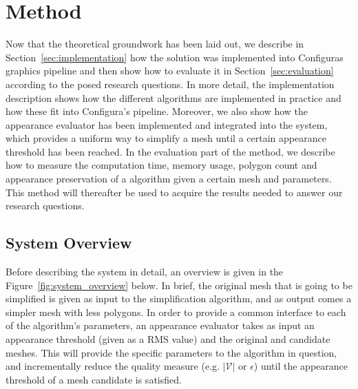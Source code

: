 
\chapter{Method} \label{cha:method}

    Now that the theoretical groundwork has been laid out, we describe in Section~\ref{sec:implementation} how the solution was implemented into Configuras graphics pipeline and then show how to evaluate it in Section~\ref{sec:evaluation} according to the posed research questions. In more detail, the implementation description shows how the different algorithms are implemented in practice and how these fit into Configura's pipeline. Moreover, we also show how the appearance evaluator has been implemented and integrated into the system, which provides a uniform way to simplify a mesh until a certain appearance threshold has been reached. In the evaluation part of the method, we describe how to measure the computation time, memory usage, polygon count and appearance preservation of a algorithm given a certain mesh and parameters. This method will thereafter be used to acquire the results needed to answer our research questions.

    \section{System Overview} \label{sec:system_overview}

    Before describing the system in detail, an overview is given in the Figure~\ref{fig:system_overview} below. In brief, the original mesh that is going to be simplified is given as input to the simplification algorithm, and as output comes a simpler mesh with less polygons. In order to provide a common interface to each of the algorithm's parameters, an appearance evaluator takes as input an appearance threshold (given as a RMS value) and the original and candidate meshes. This will provide the specific parameters to the algorithm in question, and incrementally reduce the quality measure (e.g. $|\mathcal{V}|$ or $\epsilon$) until the appearance threshold of a mesh candidate is satisfied.

